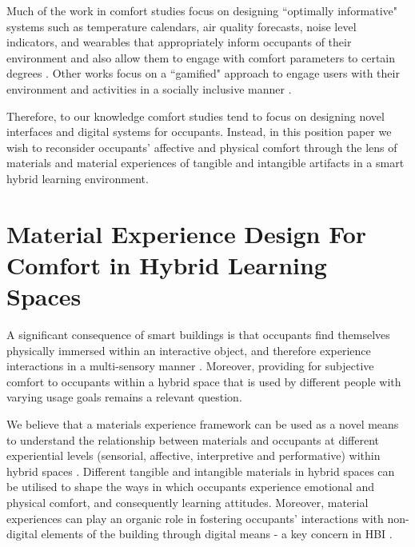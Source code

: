 \documentclass[acmconf, anonymous, review]{acmart}
\begin{document}
Much of the work in comfort studies focus on designing ``optimally informative" systems such as temperature calendars, air quality forecasts, noise level indicators, and wearables that appropriately inform occupants of their environment and also allow them to engage with comfort parameters to certain degrees  \cite{costanza2016bit, milenkovic2013improving, kim2020designing}. Other works focus on a ``gamified" approach to engage users with their environment and activities in a socially inclusive manner \cite{mathur2015tiny, kwallek1997impact, zhong2022augmenting}. 

Therefore, to our knowledge comfort studies tend to focus on designing novel interfaces and digital systems for occupants. Instead, in this position paper we wish to reconsider occupants' affective and physical comfort through the lens of materials and material experiences of tangible and intangible artifacts in a smart hybrid learning environment. 


\section{Material Experience Design For Comfort in Hybrid Learning Spaces}

A significant consequence of smart buildings is that occupants find themselves physically immersed within an interactive object, and therefore experience interactions in a multi-sensory manner \cite{nembrini2017human}. Moreover, providing for subjective comfort to occupants within a hybrid space that is used by different people with varying usage goals remains a relevant question. 

We believe that a materials experience framework can be used as a novel means to understand the relationship between materials and occupants at different experiential levels (sensorial, affective, interpretive and performative) within hybrid spaces \cite{giaccardi2015foundations}. Different tangible and intangible materials in hybrid spaces can be utilised to shape the ways in which occupants experience emotional and physical comfort, and consequently learning attitudes. Moreover, material
experiences can play an organic role in fostering occupants' interactions with non-digital elements of the building through digital means - a key concern in HBI \cite{nembrini2017human}. 

\end{document}
